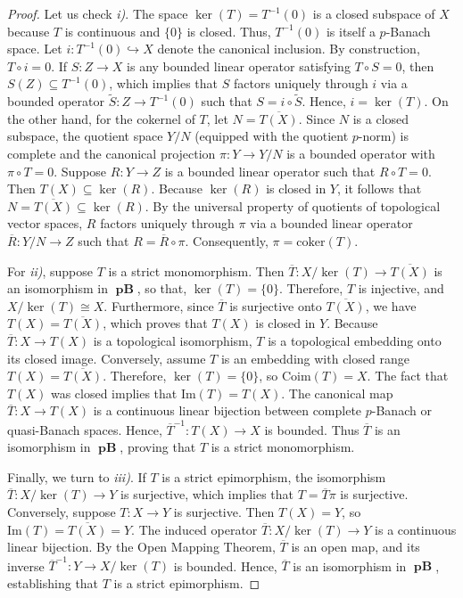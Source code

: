 \documentclass[12pt,a4paper]{amsproc}
\theoremstyle{remark}
\theoremstyle{definition}
\newcommand{\pBan}{\operatorname{\textbf{pB}}}
\numberwithin{equation}{section}
\begin{document}
\begin{proof} Let us check \emph{i)}. The space $\ker(T) = T^{-1}(0)$ is a closed subspace of $X$ because $T$ is continuous and $\{0\}$ is closed. Thus, $T^{-1}(0)$ is itself a $p$-Banach space. Let $i: T^{-1}(0) \hookrightarrow X$ denote the canonical inclusion. By construction, $T \circ i = 0$. If $S: Z \to X$ is any bounded linear operator satisfying $T \circ S = 0$, then $S(Z) \subseteq T^{-1}(0)$, which implies that $S$ factors uniquely through $i$ via a bounded operator $\widetilde{S}: Z \to T^{-1}(0)$ such that $S = i \circ \widetilde{S}$. Hence, $i = \ker(T)$. On the other hand, for the cokernel of $T$, let $N = \overline{T(X)}$. Since $N$ is a closed subspace, the quotient space $Y/N$ (equipped with the quotient $p$-norm) is complete and the canonical projection $\pi: Y \to Y/N$ is a bounded operator with $\pi \circ T = 0$. Suppose $R: Y \to Z$ is a bounded linear operator such that $R \circ T = 0$. Then $T(X) \subseteq \ker(R)$. Because $\ker(R)$ is closed in $Y$, it follows that $N = \overline{T(X)} \subseteq \ker(R)$. By the universal property of quotients of topological vector spaces, $R$ factors uniquely through $\pi$ via a bounded linear operator $\overline{R}: Y/N \to Z$ such that $R = \overline{R} \circ \pi$. Consequently, $\pi = \mathrm{coker}(T)$.
    \par For \emph{ii)}, suppose $T$ is a strict monomorphism. Then $\overline{T}: X / \ker(T) \to \overline{T(X)}$ is an isomorphism in $\boldsymbol{\pBan}$, so that, $\ker(T) = \{0\}$. Therefore, $T$ is injective, and $X / \ker(T) \cong X$. Furthermore, since $\overline{T}$ is surjective onto $\overline{T(X)}$, we have $T(X) = \overline{T(X)}$, which proves that $T(X)$ is closed in $Y$. Because $\overline{T}: X \to T(X)$ is a topological isomorphism, $T$ is a topological embedding onto its closed image. Conversely, assume $T$ is an embedding with closed range $T(X) = \overline{T(X)}$. Therefore, $\ker(T) = \{0\}$, so $\mathrm{Coim}(T) = X$. The fact that $T(X)$ was closed implies that $\mathrm{Im}(T) = T(X)$. The canonical map $\overline{T}: X \to T(X)$ is a continuous linear bijection between complete $p$-Banach or quasi-Banach spaces. Hence, $\overline{T}^{-1}: T(X) \to X$ is bounded. Thus $\overline{T}$ is an isomorphism in $\boldsymbol{\pBan}$, proving that $T$ is a strict monomorphism.

\par Finally, we turn to \emph{iii)}. If $T$ is a strict epimorphism, the isomorphism $\overline{T}: X/\ker(T) \to Y$ is surjective, which implies that $T = \overline{T} \pi$ is surjective. Conversely, suppose $T: X \to Y$ is surjective. Then $T(X) = Y$, so $\mathrm{Im}(T) = \overline{T(X)} = Y$. The induced operator $\overline{T}: X/\ker(T) \to Y$ is a continuous linear bijection. By the Open Mapping Theorem, $\overline{T}$ is an open map, and its inverse $\overline{T}^{-1}: Y \to X/\ker(T)$ is bounded. Hence, $\overline{T}$ is an isomorphism in $\boldsymbol{\pBan}$, establishing that $T$ is a strict epimorphism.
\end{proof}
\end{document}
